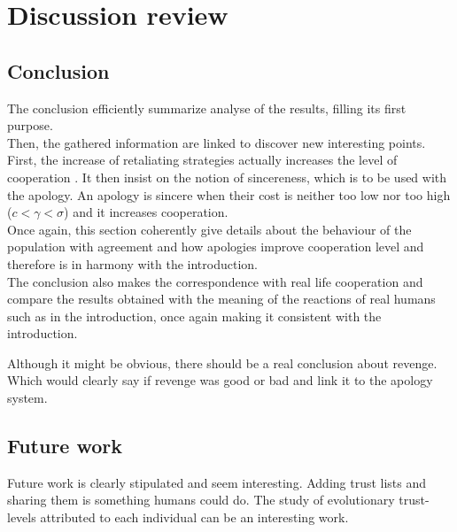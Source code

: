 \documentclass{article}
\begin{document}
\section{Discussion review}

\subsection{Conclusion}

The conclusion efficiently summarize analyse of the results, filling its first purpose.\\

Then, the gathered information are linked to discover new interesting points. First, the increase of retaliating strategies actually increases the level of cooperation . It then insist on the notion of sincereness, which is to be used with the apology. An apology is sincere when their cost is neither too low nor too high ($c<\gamma<\sigma$) and it increases cooperation.\\

Once again, this section coherently give details about the behaviour of the population with agreement and how apologies improve cooperation level and therefore is in harmony with the introduction.\\

The conclusion also makes the correspondence with real life cooperation and compare the results obtained with the meaning of the reactions of real humans such as in the introduction, once again making it consistent with the introduction.

Although it might be obvious, there should be a real conclusion about revenge. Which would clearly say if revenge was good or bad and link it to the apology system.


\subsection{Future work}

Future work is clearly stipulated and seem interesting. Adding trust lists and sharing them is something humans could do.
The study of evolutionary trust-levels attributed to each individual can be an interesting work.
\end{document}
